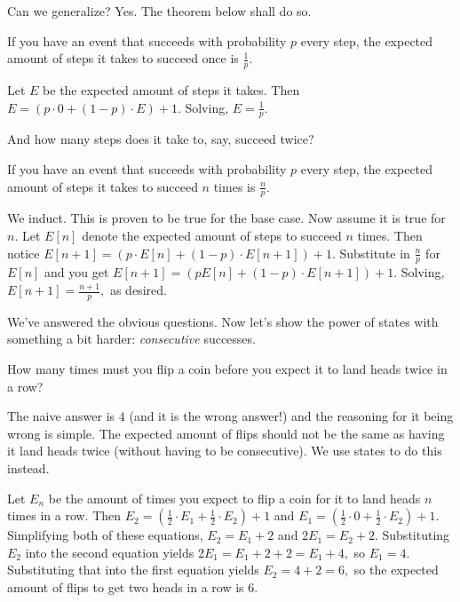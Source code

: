 \documentclass[blue,onecol]{shooting}
\begin{document}
Can we generalize? Yes. The theorem below shall do so.

\begin{theo}
If you have an event that succeeds with probability $p$ every step, the expected amount of steps it takes to succeed once is $\frac{1}{p}.$
\end{theo}

\begin{pro}
Let $E$ be the expected amount of steps it takes. Then $E=(p\cdot 0+(1-p)\cdot E)+1.$ Solving, $E=\frac{1}{p}.$
\end{pro}

And how many steps does it take to, say, succeed twice?

\begin{theo}
If you have an event that succeeds with probability $p$ every step, the expected amount of steps it takes to succeed $n$ times is $\frac{n}{p}.$
\end{theo}

\begin{pro}
We induct. This is proven to be true for the base case. Now assume it is true for $n.$ Let $E[n]$ denote the expected amount of steps to succeed $n$ times. Then notice $E[n+1]=(p\cdot E[n]+(1-p)\cdot E[n+1])+1.$ Substitute in $\frac{n}{p}$ for $E[n]$ and you get $E[n+1]=(pE[n]+(1-p)\cdot E[n+1])+1.$ Solving, $E[n+1]=\frac{n+1}{p},$ as desired.
\end{pro}

We've answered the obvious questions. Now let's show the power of states with something a bit harder: \textit{consecutive} successes.

\begin{exam}
How many times must you flip a coin before you expect it to land heads twice in a row?
\end{exam}

The naive answer is $4$ (and it is the wrong answer!) and the reasoning for it being wrong is simple. The expected amount of flips should not be the same as having it land heads twice (without having to be consecutive). We use states to do this instead.

\begin{sol}
Let $E_n$ be the amount of times you expect to flip a coin for it to land heads $n$ times in a row. Then $E_2=(\frac{1}{2}\cdot E_1+\frac{1}{2}\cdot E_2)+1$ and $E_1=(\frac{1}{2}\cdot 0+\frac{1}{2}\cdot E_2)+1.$ Simplifying both of these equations, $E_2=E_1+2$ and $2E_1=E_2+2.$ Substituting $E_2$ into the second equation yields $2E_1=E_1+2+2=E_1+4,$ so $E_1=4.$ Substituting that into the first equation yields $E_2=4+2=6,$ so the expected amount of flips to get two heads in a row is $6.$
\end{sol}
\end{document}

